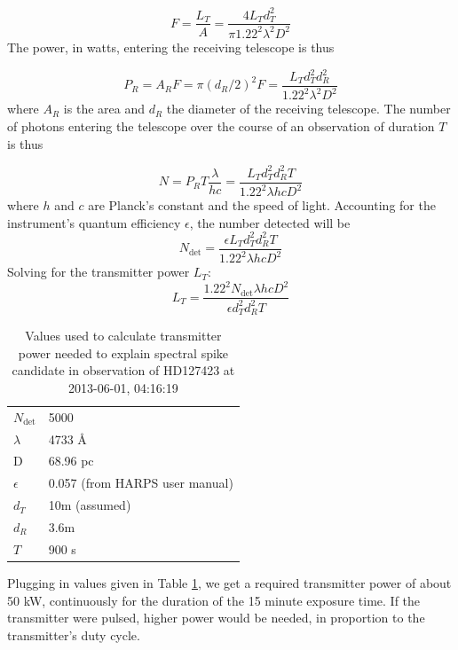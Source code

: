 \documentclass[twocolumn]{aastex701}
\begin{document}
\begin{equation}
    F = \frac{L_T}{A} = \frac{4 L_T d_T^2}{\pi 1.22^2 \lambda^2 D^2}
\end{equation}
The power, in watts, entering the receiving telescope is thus

\begin{equation}
    P_R = A_R F = \pi (d_R/2)^2 F = \frac{L_T d_T^2 d_R^2}{1.22^2 \lambda^2 D^2}
\end{equation}
where $A_R$ is the area and $d_R$ the diameter of the receiving telescope.  The number of photons entering the telescope over the course of an observation of duration $T$ is thus

\begin{equation}
    N = P_R T \frac{\lambda}{h c} = \frac{L_T d_T^2 d_R^2 T}{1.22^2 \lambda h c D^2}
\end{equation}
where $h$ and $c$ are Planck's constant and the speed of light.  Accounting for the instrument's quantum efficiency $\epsilon$, the number detected will be
\begin{equation}
    N_{\mbox{det}} = \frac{\epsilon L_T d_T^2 d_R^2 T}{1.22^2 \lambda h c D^2}
\end{equation}
Solving for the transmitter power $L_T$:
\begin{equation}
    L_T = \frac{1.22^2 N_{\mbox{det}} \lambda h c D^2}{\epsilon d_T^2 d_R^2 T}
\end{equation}

\begin{table}[h]
\begin{tabular}{ll}
$N_{\mbox{det}}$ & 5000\\
$\lambda$ & 4733 \AA \\
D & 68.96 pc \\
$\epsilon$ & 0.057 (from HARPS user manual)\\
$d_T$ & 10m (assumed) \\
$d_R$ & 3.6m \\
$T$ & 900 s\\
\end{tabular}
\label{t:powervalues}
\caption{Values used to calculate transmitter power needed to explain spectral spike candidate in observation of HD127423 at 2013-06-01, 04:16:19}
\end{table}

Plugging in values given in Table \ref{t:powervalues}, we get a required transmitter power of about 50 kW, continuously for the duration of the 15 minute exposure time. If the transmitter were pulsed, higher power would be needed, in proportion to the transmitter's duty cycle. 
\end{document}
